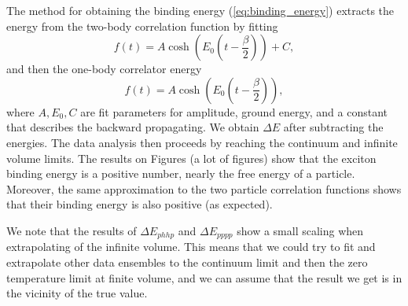 The method for obtaining the binding energy (\ref{eq:binding_energy}) extracts the energy from the two-body correlation function by fitting
\begin{equation}
    f(t) = A\cosh(E_0(t-\frac{\beta}{2})) + C,
\end{equation}
and then the one-body correlator energy
\begin{equation}
    f(t) = A\cosh(E_0(t-\frac{\beta}{2})),
\end{equation}
where $A, E_0, C$ are fit parameters for amplitude, ground energy, and a constant that describes the backward propagating. We obtain $\Delta E$ after subtracting the energies. The data analysis then proceeds by reaching the continuum and infinite volume limits. The results on Figures (a lot of figures) show that the exciton binding energy is a positive number, nearly the free energy of a particle. Moreover, the same approximation to the two particle correlation functions shows that their binding energy is also positive (as expected).

We note that the results of $\Delta E_{phhp}$ and $\Delta E_{pppp}$ show a small scaling when extrapolating of the infinite volume. This means that we could try to fit and extrapolate other data ensembles to the continuum limit and then the zero temperature limit at finite volume, and we can assume that the result we get is in the vicinity of the true value.




